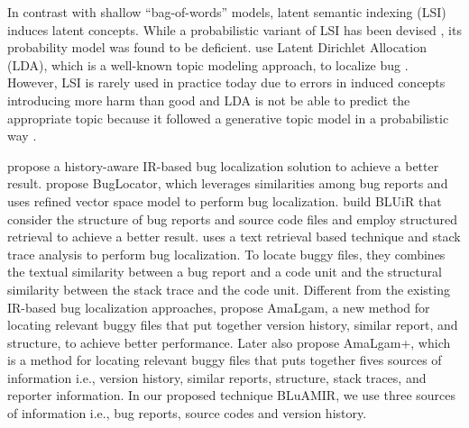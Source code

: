 \documentclass[conference]{IEEEtran}
\begin{document}
In contrast with shallow “bag-of-words” models, latent semantic indexing (LSI) induces latent concepts. While a probabilistic variant of LSI has been devised \cite{Hofmann}, its probability model was found to be deficient.
\citet{Lukins2} use Latent Dirichlet Allocation (LDA), which is a well-known topic modeling approach, to localize bug \cite{Lukins2}.
However, LSI is rarely used in practice today due to errors in induced concepts introducing more harm than good \cite{Hofmann} and LDA is not be able to predict the appropriate topic because it followed a generative topic model in a probabilistic way \cite{Lukins}.

\citet{Sisman} propose a history-aware IR-based bug localization solution to achieve a better
result. \citet{Jian} propose BugLocator, which leverages similarities among bug reports and uses refined vector space model to perform bug localization. \citet{Saha} build BLUiR that consider the structure of bug reports and source code files and employ structured retrieval to achieve a better result. \citet{Moreno} uses a text retrieval based technique and stack trace analysis to perform bug localization. To locate buggy files, they combines the textual similarity between a bug report and a code unit and the structural similarity between the stack trace and the code unit. Different from the existing IR-based bug localization approaches, \citet{Wang} propose AmaLgam, a new method for locating relevant buggy files that put together version history, similar report, and structure, to achieve better performance. Later \cite{Wang2} also propose AmaLgam+, which is a method for locating relevant buggy files that puts together fives sources of information i.e., version history, similar reports, structure, stack traces, and reporter information.
In our proposed technique BLuAMIR, we use three sources of information i.e., bug reports, source codes and version history.
\end{document}

